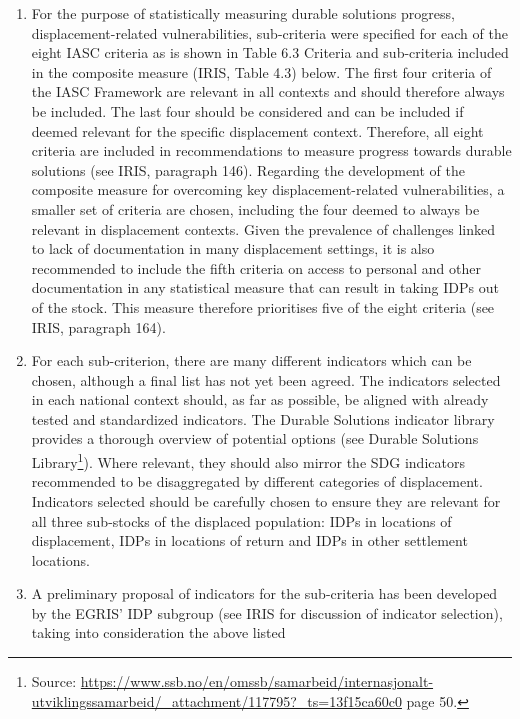\documentclass[
]{article}
\begin{document}
\begin{enumerate}
\def\labelenumi{\arabic{enumi}.}
\setcounter{enumi}{436}
\item
  For the purpose of statistically measuring durable solutions
  progress, displacement-related vulnerabilities, sub-criteria were
  specified for each of the eight IASC criteria as is shown in Table
  6.3 Criteria and sub-criteria included in the composite measure
  (IRIS, Table 4.3) below. The first four criteria of the IASC
  Framework are relevant in all contexts and should therefore always
  be included. The last four should be considered and can be included
  if deemed relevant for the specific displacement context. Therefore,
  all eight criteria are included in recommendations to measure
  progress towards durable solutions (see IRIS, paragraph 146).
  Regarding the development of the composite measure for overcoming
  key displacement-related vulnerabilities, a smaller set of criteria
  are chosen, including the four deemed to always be relevant in
  displacement contexts. Given the prevalence of challenges linked to
  lack of documentation in many displacement settings, it is also
  recommended to include the fifth criteria on access to personal and
  other documentation in any statistical measure that can result in
  taking IDPs out of the stock. This measure therefore prioritises
  five of the eight criteria (see IRIS, paragraph 164).
\item
  For each sub-criterion, there are many different indicators which
  can be chosen, although a final list has not yet been agreed. The
  indicators selected in each national context should, as far as
  possible, be aligned with already tested and standardized
  indicators. The Durable Solutions indicator library provides a
  thorough overview of potential options (see Durable Solutions
  Library\footnote{Source:
    \url{https://www.ssb.no/en/omssb/samarbeid/internasjonalt-utviklingssamarbeid/_attachment/117795?_ts=13f15ca60c0}
    page 50.}). Where relevant, they should also mirror the SDG
  indicators recommended to be disaggregated by different categories
  of displacement. Indicators selected should be carefully chosen to
  ensure they are relevant for all three sub-stocks of the displaced
  population: IDPs in locations of displacement, IDPs in locations of
  return and IDPs in other settlement locations.
\item
  A preliminary proposal of indicators for the sub-criteria has been
  developed by the EGRIS' IDP subgroup (see IRIS for discussion of
  indicator selection), taking into consideration the above listed

\end{enumerate}
\end{document}
